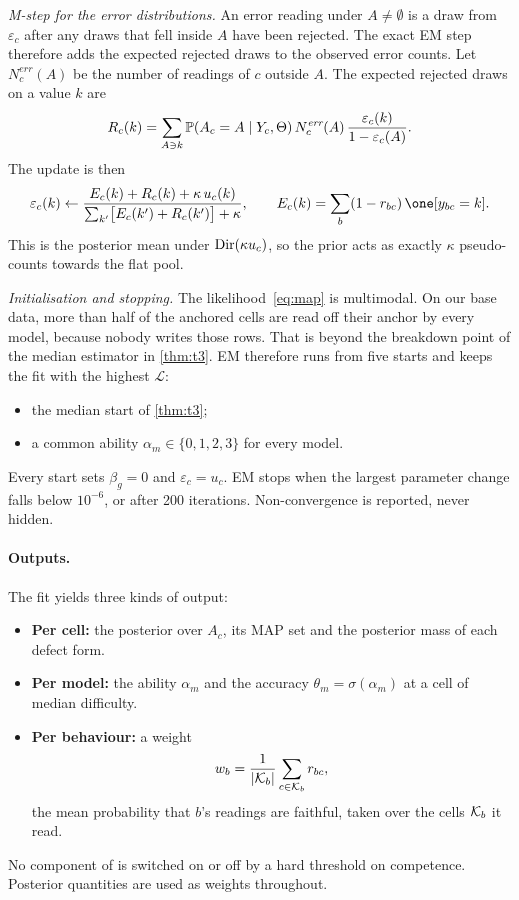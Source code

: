 \emph{M-step for the error distributions.} An error reading under $A\neq\emptyset$ is a draw from $\varepsilon_c$ after any draws that fell inside $A$ have been rejected. The exact EM step therefore adds the expected rejected draws to the observed error counts. Let $N_c^{\textit{err}}(A)$ be the number of readings of $c$ outside $A$. The expected rejected draws on a value $k$ are
\begin{equation}
\label{eq:mstep-eps-rej}
R_c(k)=\sum_{A\ni k}\mathbb{P}(A_c=A\mid Y_c,\Theta)\,N_c^{\textit{err}}(A)\,\frac{\varepsilon_c(k)}{1-\varepsilon_c(A)} .
\end{equation}
The update is then
\begin{equation}
\label{eq:mstep-eps}
\varepsilon_c(k)\leftarrow\frac{E_c(k)+R_c(k)+\kappa\,u_c(k)}{\sum_{k'}\bigl[E_c(k')+R_c(k')\bigr]+\kappa},
\qquad E_c(k)=\sum_b(1-r_{bc})\,\one[y_{bc}=k] .
\end{equation}
This is the posterior mean under $\mathrm{Dir}(\kappa u_c)$, so the prior acts as exactly $\kappa$ pseudo-counts towards the flat pool.

\emph{Initialisation and stopping.} The likelihood~\eqref{eq:map} is multimodal. On our base data, more than half of the anchored cells are read off their anchor by every model, because nobody writes those rows. That is beyond the breakdown point of the median estimator in \cref{thm:t3}. EM therefore runs from five starts and keeps the fit with the highest $\mathcal{L}$:
\begin{itemize}[leftmargin=*]
\item the median start of \cref{thm:t3};
\item a common ability $\alpha_m\in\{0,1,2,3\}$ for every model.
\end{itemize}
Every start sets $\beta_g=0$ and $\varepsilon_c=u_c$. EM stops when the largest parameter change falls below $10^{-6}$, or after 200 iterations. Non-convergence is reported, never hidden.

\paragraph{Outputs.} The fit yields three kinds of output:
\begin{itemize}[leftmargin=*]
\item \textbf{Per cell:} the posterior over $A_c$, its MAP set and the posterior mass of each defect form.
\item \textbf{Per model:} the ability $\alpha_m$ and the accuracy $\theta_m=\sigma(\alpha_m)$ at a cell of median difficulty.
\item \textbf{Per behaviour:} a weight
\begin{equation}
\label{eq:weight}
w_b=\frac{1}{|\mathcal{K}_b|}\sum_{c\in\mathcal{K}_b}r_{bc},
\end{equation}
the mean probability that $b$'s readings are faithful, taken over the cells $\mathcal{K}_b$ it read.
\end{itemize}
No component of \specdx is switched on or off by a hard threshold on competence. Posterior quantities are used as weights throughout.

